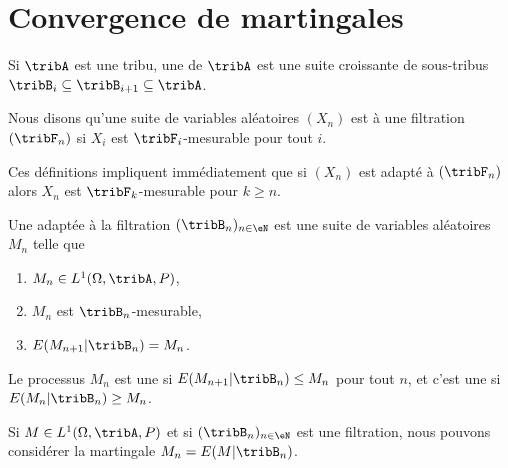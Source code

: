 
\section{Convergence de martingales}

\begin{definition}
    Si \( \tribA\) est une tribu, une  de \( \tribA\) est une suite croissante de sous-tribus \( \tribB_i\subseteq\tribB_{i+1}\subseteq\tribA\).

    Nous disons qu'une suite de variables aléatoires \( (X_n)\) est  à une filtration \( (\tribF_n)\) si \( X_i\) est \( \tribF_i\)-mesurable pour tout \( i\).
\end{definition}

Ces définitions impliquent immédiatement que si \( (X_n)\) est adapté à \( (\tribF_n)\) alors \( X_n\) est \( \tribF_k\)-mesurable pour \( k\geq n\).

\begin{definition}
    Une  adaptée à la filtration \( (\tribB_n)_{n\in \eN}\) est une suite de variables aléatoires \( M_n\) telle que
    \begin{enumerate}
        \item
            \(M_n\in L^1(\Omega,\tribA,P)\),
        \item
            \( M_n\) est \( \tribB_n\)-mesurable,
        \item
            \( E(M_{n+1}|\tribB_n)=M_n\).
    \end{enumerate}

    Le processus \( M_n\) est une  si \( E(M_{n+1}|\tribB_n)\leq M_n\) pour tout \( n\), et c'est une  si \( E(M_n|\tribB_n)\geq M_n\).
\end{definition}

\begin{example}
    Si \( M\in L^1(\Omega,\tribA,P)\) et si \( (\tribB_n)_{n\in \eN}\) est une filtration, nous pouvons considérer la martingale \( M_n=E(M|\tribB_n)\).
\end{example}


